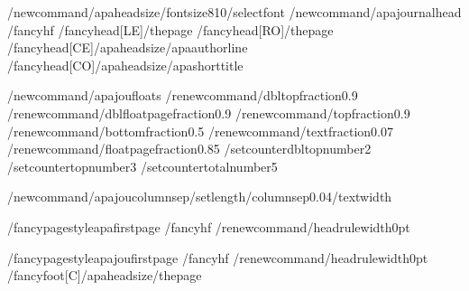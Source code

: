 %
/newcommand{/apaheadsize}{/fontsize{8}{10}/selectfont}
/newcommand{/apajournalhead}{%
  /fancyhf{}%
  /fancyhead[LE]{/thepage}%
  /fancyhead[RO]{/thepage}%
  /fancyhead[CE]{{/apaheadsize/apaauthorline}}%
  /fancyhead[CO]{{/apaheadsize/apashorttitle}}}

%
/newcommand{/apajoufloats}{%
  /renewcommand{/dbltopfraction}{0.9}%
  /renewcommand{/dblfloatpagefraction}{0.9}%
  /renewcommand{/topfraction}{0.9}%
  /renewcommand{/bottomfraction}{0.5}%
  /renewcommand{/textfraction}{0.07}%
  /renewcommand{/floatpagefraction}{0.85}%
  /setcounter{dbltopnumber}{2}%
  /setcounter{topnumber}{3}%
  /setcounter{totalnumber}{5}}

/newcommand{/apajoucolumnsep}{/setlength{/columnsep}{0.04/textwidth}}

/fancypagestyle{apafirstpage}{%
  /fancyhf{}%
  /renewcommand{/headrulewidth}{0pt}}

%
/fancypagestyle{apajoufirstpage}{%
  /fancyhf{}%
  /renewcommand{/headrulewidth}{0pt}%
  /fancyfoot[C]{{/apaheadsize/thepage}}}

